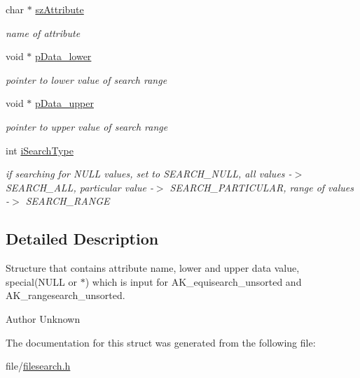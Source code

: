 \begin{DoxyCompactItemize}
\item 
\hypertarget{structsearch__params_ae8faeffae5fba755ed9f93a0028200ce}{char $\ast$ \hyperlink{structsearch__params_ae8faeffae5fba755ed9f93a0028200ce}{sz\+Attribute}}\label{structsearch__params_ae8faeffae5fba755ed9f93a0028200ce}

\begin{DoxyCompactList}\small\item\em name of attribute \end{DoxyCompactList}\item 
\hypertarget{structsearch__params_a061c7b5e9a3163f19dac0d3a681d63d0}{void $\ast$ \hyperlink{structsearch__params_a061c7b5e9a3163f19dac0d3a681d63d0}{p\+Data\+\_\+lower}}\label{structsearch__params_a061c7b5e9a3163f19dac0d3a681d63d0}

\begin{DoxyCompactList}\small\item\em pointer to lower value of search range \end{DoxyCompactList}\item 
\hypertarget{structsearch__params_ab5b610fb21d476cb745ea943f8cf01f8}{void $\ast$ \hyperlink{structsearch__params_ab5b610fb21d476cb745ea943f8cf01f8}{p\+Data\+\_\+upper}}\label{structsearch__params_ab5b610fb21d476cb745ea943f8cf01f8}

\begin{DoxyCompactList}\small\item\em pointer to upper value of search range \end{DoxyCompactList}\item 
\hypertarget{structsearch__params_afbc6035423d003364a44bc5c984b49fa}{int \hyperlink{structsearch__params_afbc6035423d003364a44bc5c984b49fa}{i\+Search\+Type}}\label{structsearch__params_afbc6035423d003364a44bc5c984b49fa}

\begin{DoxyCompactList}\small\item\em if searching for N\+U\+L\+L values, set to S\+E\+A\+R\+C\+H\+\_\+\+N\+U\+L\+L, all values -\/$>$ S\+E\+A\+R\+C\+H\+\_\+\+A\+L\+L, particular value -\/$>$ S\+E\+A\+R\+C\+H\+\_\+\+P\+A\+R\+T\+I\+C\+U\+L\+A\+R, range of values -\/$>$ S\+E\+A\+R\+C\+H\+\_\+\+R\+A\+N\+G\+E \end{DoxyCompactList}\end{DoxyCompactItemize}


\subsection{Detailed Description}
Structure that contains attribute name, lower and upper data value, special(\+N\+U\+L\+L or $\ast$) which is input for A\+K\+\_\+equisearch\+\_\+unsorted and A\+K\+\_\+rangesearch\+\_\+unsorted. 

\begin{DoxyAuthor}{Author}
Unknown 
\end{DoxyAuthor}


The documentation for this struct was generated from the following file\+:\begin{DoxyCompactItemize}
\item 
file/\hyperlink{filesearch_8h}{filesearch.\+h}\end{DoxyCompactItemize}
